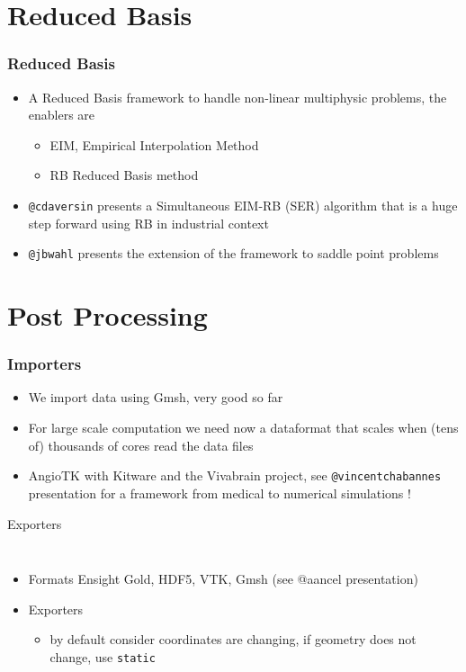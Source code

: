 
\section{Reduced Basis}
\begin{frame}[fragile]
  \frametitle{Reduced Basis}
  \begin{itemize}
  \item A Reduced Basis framework to handle  non-linear multiphysic
    problems, the enablers are
    \begin{itemize}
    \item EIM, Empirical Interpolation Method
    \item RB Reduced Basis method
    \end{itemize}
  \item \verb+@cdaversin+ presents a Simultaneous EIM-RB (SER) algorithm
    that is a huge step forward using RB in industrial context
  \item \verb+@jbwahl+ presents the extension of the framework to
    saddle point problems
  \end{itemize}
\end{frame}

\section{Post Processing}

\begin{frame}[fragile]
  \frametitle{Importers}
  \begin{itemize}
  \item We import data using Gmsh, very good so far
  \item For large scale computation we need now a dataformat that
    scales when (tens of) thousands of cores read the data files
  \item AngioTK with Kitware and the Vivabrain project, see \verb+@vincentchabannes+ presentation for a
    framework from medical to numerical simulations !
  \end{itemize}
\end{frame}
\begin{frame}[fragile]{Exporters}
  \begin{columns}[c]
    \begin{itemize}
    \item Formats Ensight Gold, HDF5, VTK, Gmsh (see @aancel presentation)
    \item Exporters
      \begin{itemize}
      \item by default consider coordinates are changing, if geometry
        does not change, use \texttt{static}
      \end{itemize}
    \end{itemize}
    \inputminted[fontsize=\tiny]{c++}{Codes/prudhomme/fud4/exporter.cpp}
  \end{columns}

\end{frame}

